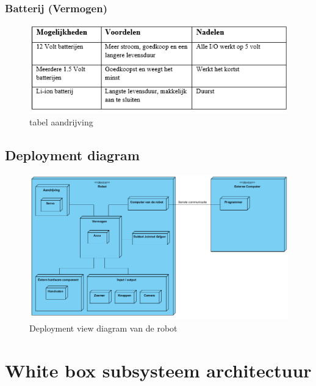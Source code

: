 \documentclass[12pt]{article} %
\begin{document}
\subsubsection{Batterij (Vermogen)}
\begin{center}
\begin{figure}[h]
\includegraphics[scale=1.]{tabelBat.png}
\caption{tabel aandrijving}
\label{fig:deployment}
\end{figure}
\end{center}
\clearpage

\subsection{Deployment diagram}
\begin{center}
\begin{figure}[h]
\includegraphics[scale=.65]{deployment.png}
\caption{Deployment view diagram van de robot}
\label{fig:deployment}
\end{figure}
\end{center}
\clearpage
\newpage%
\section{White box subsysteem architectuur}
\label{sec:conclusion}
\end{document}

